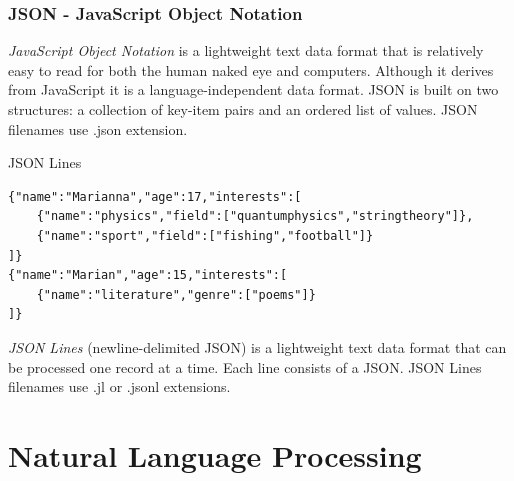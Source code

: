 \documentclass{beamer}
\begin{document}
\begin{frame}
    \frametitle{JSON - JavaScript Object Notation}
    \begin{definition}
        \emph{JavaScript Object Notation} is a lightweight text data format that is relatively easy to read for both the human naked eye and computers. Although it derives from JavaScript it is a language-independent data format. JSON is built on two structures: a collection of key-item pairs and an ordered list of values. JSON filenames use .json extension.
    \end{definition}
\end{frame}


\begin{frame}[fragile]{JSON Lines}
\begin{verbatim}
{"name":"Marianna","age":17,"interests":[
    {"name":"physics","field":["quantumphysics","stringtheory"]},
    {"name":"sport","field":["fishing","football"]}
]}
{"name":"Marian","age":15,"interests":[
    {"name":"literature","genre":["poems"]}
]}
\end{verbatim}
\begin{definition}
    \emph{JSON Lines} (newline-delimited JSON) is a lightweight text data format that can be processed one record at a time. Each line consists of a JSON. JSON Lines filenames use .jl or .jsonl extensions.
\end{definition}
\end{frame}

\section[NLP]{Natural Language Processing}
\end{document}
